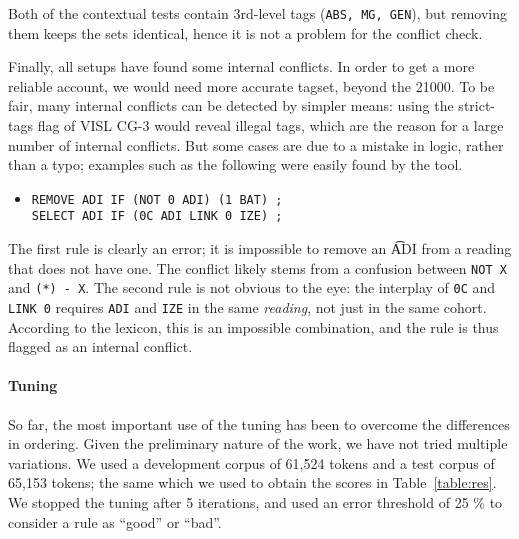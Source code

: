 {{\noindent Both of the contextual tests contain 3rd-level tags
(\texttt{ABS, MG, GEN}), but removing them keeps the sets identical,
hence it is not a problem for the conflict check.



Finally, all setups have found some internal conflicts. In order to
get a more reliable account, we would need more accurate tagset,
beyond the 21000. To be fair, many internal conflicts can be detected
by simpler means: using the {\sc strict-tags} flag of VISL CG-3 would reveal
illegal tags, which are the reason for a large number of internal
conflicts.  But some cases are due to a mistake in logic, rather than
a typo; examples such as the following were easily found by the
tool.
\begin{itemize}
\item[]
\begin{verbatim}
REMOVE ADI IF (NOT 0 ADI) (1 BAT) ;
SELECT ADI IF (0C ADI LINK 0 IZE) ;
\end{verbatim}
\end{itemize}

\noindent The first rule is clearly an error; it is impossible to
remove an \t{ADI} from a reading that does not have one.  The conflict
likely stems from a confusion between \texttt{NOT X} and \texttt{(*) -
  X}.  The second rule is not obvious to the eye: the interplay of
\texttt{0C} and \texttt{LINK 0} requires \texttt{ADI} and \texttt{IZE}
in the same \emph{reading}, not just in the same cohort. According to
the lexicon, this is an impossible combination, and the rule is thus
flagged as an internal conflict.



\paragraph{Tuning}

So far, the most important use of the tuning has been to overcome
the differences in ordering.
Given the preliminary nature of the work, we have not tried multiple
variations. We used a development corpus of 61,524
tokens and a test corpus of 65,153 tokens; the same which we used to
obtain the scores in Table~\ref{table:res}. We stopped the tuning
after 5 iterations, and used an error threshold of 25 \% to consider a
rule as ``good'' or ``bad''.

}}
